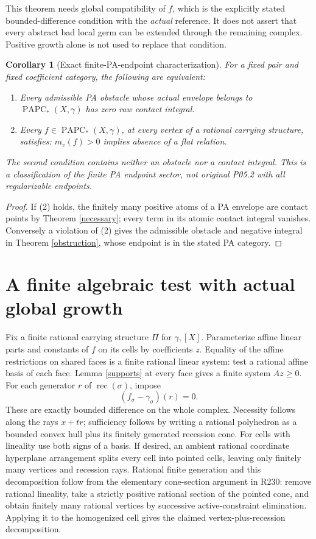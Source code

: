 \documentclass[11pt]{article}
\newtheorem{corollary}[theorem]{Corollary}
\newcommand{\PAPC}{\operatorname{PAPC}}
\newcommand{\rec}{\operatorname{rec}}
\begin{document}
This theorem needs global compatibility of \(f\), which is the explicitly
stated bounded-difference condition with the \emph{actual} reference.
It does not assert that every abstract bad local germ can be extended
through the remaining complex. Positive growth alone is not used to
replace that condition.

\begin{corollary}[Exact finite-PA-endpoint characterization]\label{scoped}
For a fixed pair and fixed coefficient category, the following are
equivalent:
\begin{enumerate}
\item Every admissible PA obstacle whose actual envelope belongs to
\(\PAPC_*(X,\gamma)\) has zero raw contact integral.
\item Every \(f\in\PAPC_*(X,\gamma)\), at every vertex of a rational
carrying structure, satisfies: \(m_v(f)>0\) implies absence of a flat
relation.
\end{enumerate}
The second condition contains neither an obstacle nor a contact integral.
This is a classification of the finite PA endpoint sector, not original
P05.2 with all regularizable endpoints.
\end{corollary}
\begin{proof}
If (2) holds, the finitely many positive atoms of a PA envelope are
contact points by Theorem \ref{necessary}; every term in its atomic
contact integral vanishes. Conversely a violation of (2) gives the
admissible obstacle and negative integral in Theorem \ref{obstruction},
whose endpoint is in the stated PA category.
\end{proof}

\section{A finite algebraic test with actual global growth}
Fix a finite rational carrying structure \(\Pi\) for \(\gamma,[X]\).
Parameterize affine linear parts and constants of \(f\) on its cells by
coefficients \(z\). Equality of the affine restrictions on shared faces
is a finite rational linear system: test a rational affine basis of each
face. Lemma \ref{supports} at every face gives a finite system
\(Az\geq0\).
For each generator \(r\) of \(\rec(\sigma)\), impose
\begin{equation}\label{growth}
 (f_\sigma-\gamma_\sigma)(r)=0.
\end{equation}
These are exactly bounded difference on the whole complex.
Necessity follows along the rays \(x+tr\); sufficiency follows by
writing a rational polyhedron as a bounded convex hull plus its
finitely generated recession cone. For cells with lineality use both
signs of a basis. If desired, an ambient rational coordinate
hyperplane arrangement splits every cell into pointed cells, leaving
only finitely many vertices and recession rays. Rational finite
generation and this decomposition follow from the elementary
cone-section argument in R230: remove rational lineality, take a
strictly positive rational section of the pointed cone, and obtain
finitely many rational vertices by successive active-constraint
elimination. Applying it to the homogenized cell gives the claimed
vertex-plus-recession decomposition.
\end{document}
